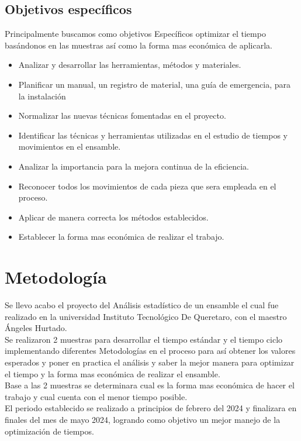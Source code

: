     \subsection{Objetivos específicos }
    Principalmente buscamos como objetivos Específicos optimizar el tiempo basándonos en las muestras así como la forma mas económica de aplicarla.  
    \begin{itemize}
        \item Analizar y desarrollar las herramientas, métodos y materiales.
        \item Planificar un manual, un registro de material, una guía de emergencia,  para la instalación   
        \item Normalizar las nuevas técnicas fomentadas en el proyecto.
        \item Identificar las técnicas y herramientas utilizadas en el estudio de tiempos y movimientos en el ensamble.
        \item Analizar la importancia  para la mejora continua de la eficiencia.
        \item Reconocer todos los movimientos de cada pieza que sera empleada en el proceso.
        \item Aplicar de manera correcta los métodos establecidos.
        \item Establecer la forma mas económica de realizar el trabajo.
    \end{itemize}
    \section{Metodología}
    
    Se llevo acabo el proyecto del Análisis estadístico de un  ensamble el cual fue realizado en la universidad Instituto Tecnológico De Queretaro, con el maestro Ángeles Hurtado.\\ Se realizaron 2 muestras para desarrollar el tiempo estándar y el tiempo ciclo implementando diferentes Metodologías en el proceso para así obtener los valores esperados y poner en practica el análisis y saber la mejor manera para optimizar el tiempo y la forma mas económica de realizar el ensamble.\\
    Base a las 2 muestras se determinara cual es la forma mas económica de hacer el trabajo y cual cuenta con el menor tiempo posible. \\
    El periodo establecido se realizado a principios de febrero del 2024 y finalizara en finales del mes de mayo 2024, logrando como objetivo un mejor manejo de la optimización de tiempos.
    
